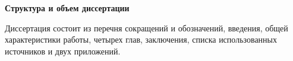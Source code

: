 \newcommand{\actuality}{\textbf{Связь работы с научными программами (проектами), темами}}
\newcommand{\aim}{\textbf{Цель, задачи, объект и предмет исследования}}
\newcommand{\novelty}{\textbf{Научная новизна}}
\newcommand{\defpositions}{\textbf{Положения, выносимые на защиту}}
\newcommand{\influence}{\textbf{Научная и практическая значимость}}
\newcommand{\reliability}{\textbf{Степень достоверности}}
\newcommand{\contribution}{\textbf{Личный вклад соискателя ученой степени в результаты диссертации}}
\newcommand{\probation}{\textbf{Апробация диссертации и информация об использовании ее результатов}}
\newcommand{\publications}{\textbf{Опубликованность результатов диссертации}}




\vspace{3mm}
\textbf{Структура и объем диссертации} 
\vspace{3mm}

Диссертация состоит из перечня сокращений и обозначений, введения, общей характеристики работы, четырех глав, заключения, списка использованных источников и двух приложений.


